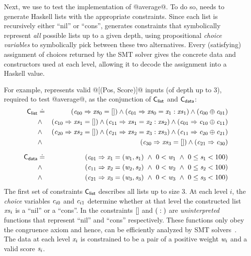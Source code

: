 Next, we use \toolname to test the implementation of @average@.
To do so, \toolname needs to generate Haskell lists with the appropriate constraints.
%
Since each list is recursively 
either ``nil'' 
or ``cons'', 
\toolname generates constraints that symbolically 
represent \emph{all} possible lists up to a given depth, 
using propositional \emph{choice variables} to 
symbolically pick between these two alternatives.
%
Every (satisfying) assignment of choices returned by 
the SMT solver gives \toolname the concrete data and 
constructors used at each level, allowing it to decode 
the assignment into a Haskell value.

For example, \toolname represents valid @[(Pos, Score)]@ 
inputs (of depth up to 3), required to test @average@, 
as the conjunction of $\mathsf{{C_{list}}}$ and $\mathsf{{C_{data}}}$:
%
\begin{eqnarray*}
\mathsf{{C_{list}}} & \doteq & (\mathit{{c}}_{00} \Rightarrow \mathit{{xs}}_0 = \mathrm{[]}) \wedge 
                          (\mathit{{c}}_{01} \Rightarrow \mathit{{xs}}_0 = \mathrm{{\mathit{{x}}_1}:{\mathit{{xs}}_1}}) \wedge 
                          (\mathit{{c}}_{00} \oplus \mathit{{c}}_{01}) \\
               & \wedge & (\mathit{{c}}_{10} \Rightarrow \mathit{{xs}}_1 = \mathrm{[]}) \wedge
                          (\mathit{{c}}_{11} \Rightarrow \mathit{{xs}}_1 = \mathrm{{\mathit{{x}}_2}:{\mathit{{xs}}_2}}) \wedge 
                          (\mathit{{c}}_{01} \Rightarrow \mathit{{c}}_{10} \oplus \mathit{{c}}_{11}) \\
               & \wedge & (\mathit{{c}}_{20} \Rightarrow \mathit{{xs}}_2 = \mathrm{[]}) \wedge 
                          (\mathit{{c}}_{21} \Rightarrow \mathit{{xs}}_2 = \mathrm{{\mathit{{x}}_3}:{\mathit{{xs}}_3}}) \wedge 
                          (\mathit{{c}}_{11} \Rightarrow \mathit{{c}}_{20} \oplus \mathit{{c}}_{21}) \\
               & \wedge & (\mathit{{c}}_{30} \Rightarrow \mathit{{xs}}_3 = \mathrm{[]}) \wedge 
                          (\mathit{{c}}_{21} \Rightarrow \mathit{{c}}_{30}) \\[0.1in]
\mathsf{{C_{data}}} & \doteq & (\mathit{{c}}_{01} \Rightarrow \mathit{{x}}_1 = \mathrm{({\mathit{{w}}_1},{\mathit{{s}}_1})} \ \wedge\ 0 < \mathit{{w}}_1 \ \wedge\ 0 \leq \mathit{{s}}_1 < 100) \\
               & \wedge & (\mathit{{c}}_{11} \Rightarrow \mathit{{x}}_2 = \mathrm{({\mathit{{w}}_2},{\mathit{{s}}_2})} \ \wedge\ 0 < \mathit{{w}}_2 \ \wedge\ 0 \leq \mathit{{s}}_2 < 100) \\
               & \wedge & (\mathit{{c}}_{21} \Rightarrow \mathit{{x}}_3 = \mathrm{({\mathit{{w}}_3},{\mathit{{s}}_3})} \ \wedge\ 0 < \mathit{{w}}_3 \ \wedge\ 0 \leq \mathit{{s}}_3 < 100)
\end{eqnarray*}
%
The first set of constraints $\mathsf{{C_{list}}}$ describes all lists up to 
size 3. At each level $i$, the \emph{choice} variables $\mathit{{c}}_{i0}$ 
and $\mathit{{c}}_{i1}$ determine whether at that level the constructed 
list $\mathit{{xs}}_i$ is a ``nil'' or a ``cons''. 
%
In the constraints $\mathrm{[]}$ and $(\mathrm{{}:{}})$ are \emph{uninterpreted} 
functions that represent ``nil'' and ``cons'' respectively. 
These functions only obey the congruence axiom and hence, can be 
efficiently analyzed by SMT solvers~\cite{Nelson81}.
%
The data at each level $\mathit{{x}}_i$ is constrained to be a pair of a 
positive weight $\mathit{{w}}_i$ and a valid score $\mathit{{s}}_i$.

